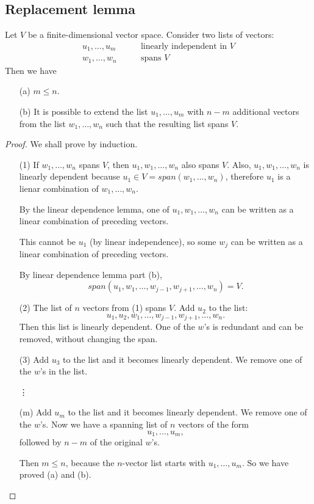 \documentclass[11pt]{article}
\begin{document}
    \subsection{Replacement lemma}

    Let $V$ be a finite-dimensional vector space. Consider two lists of vectors:
    \begin{align*}
        u_1, \dots, u_m \qquad & \text{linearly independent in }V \\
        w_1, \dots, w_n \qquad & \text{spans }V
    \end{align*}
    Then we have
    \begin{enumerate}
        \item[(a)] \(m \leq n.\)
        \item[(b)] It is possible to extend the list \(u_1, \dots, u_m\) with \(n-m\) additional vectors from the list \(w_1, \dots, w_n\) such that the resulting list spans $V$.  
    \end{enumerate}

    \begin{proof}
        We shall prove by induction.

        \begin{enumerate}
            \item[(1)] If \(w_1, \dots, w_n\) spans $V$, then \(u_1, w_1, \dots, w_n\) also spans $V$. Also, \(u_1, w_1, \dots, w_n\) is linearly dependent because \(u_1 \in V = span(w_1, \dots, w_n)\), therefore \(u_1\) is a lienar combination of \(w_1, \dots, w_n.\) 
            
            By the linear dependence lemma, one of \(u_1, w_1, \dots, w_n\) can be written as a linear combination of preceding vectors.

            This cannot be \(u_1\) (by linear independence), so some \(w_j\) can be written as a linear combination of preceding vectors.

            By linear dependence lemma part (b), \[span(u_1, w_1, \dots, w_{j-1}, w_{j+1}, \dots, w_n) = V.\]

            \item[(2)] The list of $n$ vectors from (1) spans $V$. Add \(u_2\) to the list: \[u_1, u_2, w_1, \dots, w_{j-1}, w_{j+1}, \dots, w_n.\] Then this list is linearly dependent. One of the $w$'s is redundant and can be removed, without changing the span.
            \item[(3)] Add $u_3$ to the list and it becomes linearly dependent. We remove one of the $w$'s in the list.
            \item[\vdots]
            \item[(m)] Add \(u_m\) to the list and it becomes linearly dependent. We remove one of the $w$'s. Now we have a spanning list of $n$ vectors of the form \[u_1, \dots, u_m,\] followed by $n-m$ of the original $w$'s.
            
            Then \(m \leq n\), because the $n$-vector list starts with \(u_1, \dots, u_m.\) So we have proved (a) and (b).
        \end{enumerate}
    \end{proof}
\end{document}
